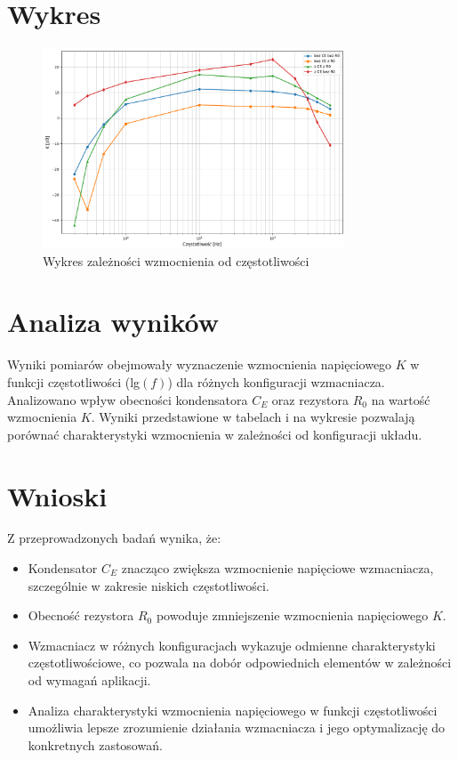 \documentclass[11pt]{article}
\begin{document}
\clearpage
\section*{Wykres}
\begin{figure}[H]
    \centering
    \includegraphics[width=0.8\textwidth]{wzmacniacz.png}
    \caption{Wykres zależności wzmocnienia od częstotliwości}
    \label{fig:wzmacniacz}
\end{figure}
\section*{Analiza wyników}
Wyniki pomiarów obejmowały wyznaczenie wzmocnienia napięciowego $K$ w funkcji częstotliwości (lg$(f)$) dla różnych konfiguracji wzmacniacza. 
Analizowano wpływ obecności kondensatora $C_E$ oraz rezystora $R_0$ na wartość wzmocnienia $K$. 
Wyniki przedstawione w tabelach i na wykresie pozwalają porównać charakterystyki wzmocnienia w zależności od konfiguracji układu.

\section*{Wnioski}
Z przeprowadzonych badań wynika, że:
\begin{itemize}
    \item Kondensator $C_E$ znacząco zwiększa wzmocnienie napięciowe wzmacniacza, szczególnie w zakresie niskich częstotliwości.
    \item Obecność rezystora $R_0$ powoduje zmniejszenie wzmocnienia napięciowego $K$.
    \item Wzmacniacz w różnych konfiguracjach wykazuje odmienne charakterystyki częstotliwościowe, co pozwala na dobór odpowiednich elementów w zależności od wymagań aplikacji.
    \item Analiza charakterystyki wzmocnienia napięciowego w funkcji częstotliwości umożliwia lepsze zrozumienie działania wzmacniacza i jego optymalizację do konkretnych zastosowań.
\end{itemize}
\end{document}
